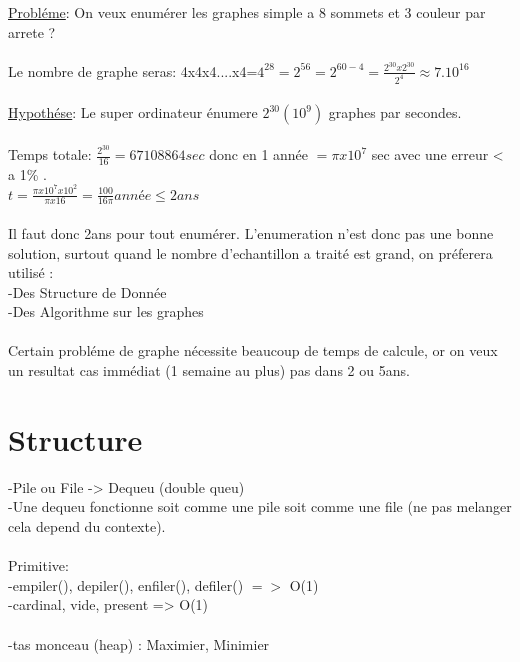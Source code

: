 \documentclass[a4paper,12pt,openany]{book}
\begin{document}
\underline{Probléme}: On veux enumérer les graphes simple a 8 sommets et 3 couleur par arrete ?\\
\\
Le nombre de graphe seras: 4x4x4....x4=$4^28 = 2^56 = 2^{60-4} = \frac{2^{30}x2^{30}}{2^4} \approx 7.10^{16}$\\
\\
\underline{Hypothése}: Le super ordinateur énumere $2^{30} (10^9)$ graphes par secondes.\\
\\
Temps totale: $\frac{2^{30}}{16} = 67 108 864 sec$ donc en 1 année $=\pi x 10^7$ sec avec une erreur < a 1\% .\\
$t=\frac{\pi x 10^7 x 10^2}{\pi x 16} = \frac{100}{16\pi} année \leqslant 2ans$\\
\\
Il faut donc 2ans pour tout enumérer. L'enumeration n'est donc pas une bonne solution, surtout quand le nombre d'echantillon a traité est grand, on préferera utilisé :\\
-Des Structure de Donnée\\
-Des Algorithme sur les graphes\\
\\
Certain probléme de graphe nécessite beaucoup de temps de calcule, or on veux un resultat cas immédiat (1 semaine au plus) pas dans 2 ou 5ans.\\


\section{Structure}

-Pile ou File -> Dequeu (double queu)\\
-Une dequeu fonctionne soit comme une pile soit comme une file (ne pas melanger cela depend du contexte).\\
\\
Primitive:\\
-empiler(), depiler(), enfiler(), defiler() $=>$ O(1)\\
-cardinal, vide\?, present\? => O(1)\\
\\
-tas monceau (heap) : Maximier, Minimier\\

\end{document}
